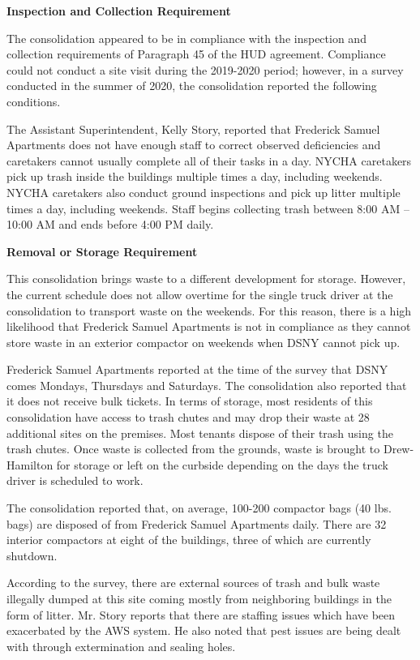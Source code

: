 

\textbf{Inspection and Collection Requirement}

The consolidation appeared to be in compliance with the inspection and collection requirements of Paragraph 45 of the HUD agreement. Compliance could not conduct a site visit during the 2019-2020 period; however, in a survey conducted in the summer of 2020, the consolidation reported the following conditions.

The Assistant Superintendent, Kelly Story, reported that Frederick Samuel Apartments does not have enough staff to correct observed deficiencies and caretakers cannot usually complete all of their tasks in a day. NYCHA caretakers pick up trash inside the buildings multiple times a day, including weekends. NYCHA caretakers also conduct ground inspections and pick up litter multiple times a day, including weekends. Staff begins collecting trash between 8:00 AM -- 10:00 AM and ends before 4:00 PM daily. 

\textbf{Removal or Storage Requirement}

This consolidation brings waste to a different development for storage. However, the current schedule does not allow overtime for the single truck driver at the consolidation to transport waste on the weekends. For this reason, there is a high likelihood that Frederick Samuel Apartments is not in compliance as they cannot store waste in an exterior compactor on weekends when DSNY cannot pick up.

Frederick Samuel Apartments reported at the time of the survey that DSNY comes Mondays, Thursdays and Saturdays. The consolidation also reported that it does not receive bulk tickets. In terms of storage, most residents of this consolidation have access to trash chutes and may drop their waste at 28 additional sites on the premises. Most tenants dispose of their trash using the trash chutes. Once waste is collected from the grounds, waste is brought to Drew-Hamilton for storage or left on the curbside depending on the days the truck driver is scheduled to work.

The consolidation reported that, on average, 100-200 compactor bags (40 lbs. bags) are disposed of from Frederick Samuel Apartments daily. There are 32 interior compactors at eight of the buildings, three of which are currently shutdown.

According to the survey, there are external sources of trash and bulk waste illegally dumped at this site coming mostly from neighboring buildings in the form of litter. Mr. Story reports that there are staffing issues which have been exacerbated by the AWS system. He also noted that pest issues are being dealt with through extermination and sealing holes.